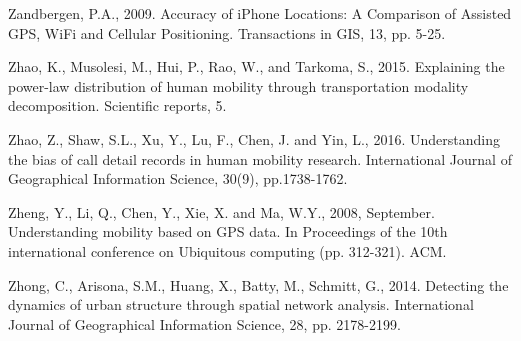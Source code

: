 \documentclass[]{tGIS2e}
\begin{document}
\begin{thebibliography}{9}
Zandbergen, P.A., 2009. Accuracy of iPhone Locations: A Comparison of Assisted GPS, WiFi and Cellular Positioning. Transactions in GIS, 13, pp. 5-25.

Zhao, K., Musolesi, M., Hui, P., Rao, W., and Tarkoma, S., 2015. Explaining the power-law distribution of human mobility through transportation modality decomposition. Scientific reports, 5.

Zhao, Z., Shaw, S.L., Xu, Y., Lu, F., Chen, J. and Yin, L., 2016. Understanding the bias of call detail records in human mobility research. International Journal of Geographical Information Science, 30(9), pp.1738-1762.

Zheng, Y., Li, Q., Chen, Y., Xie, X. and Ma, W.Y., 2008, September. Understanding mobility based on GPS data. In Proceedings of the 10th international conference on Ubiquitous computing (pp. 312-321). ACM.

Zhong, C., Arisona, S.M., Huang, X., Batty, M., Schmitt, G., 2014. Detecting the dynamics of urban structure through spatial network analysis. International Journal of Geographical Information Science, 28, pp. 2178-2199.
\end{thebibliography}

\label{lastpage}
\end{document}
